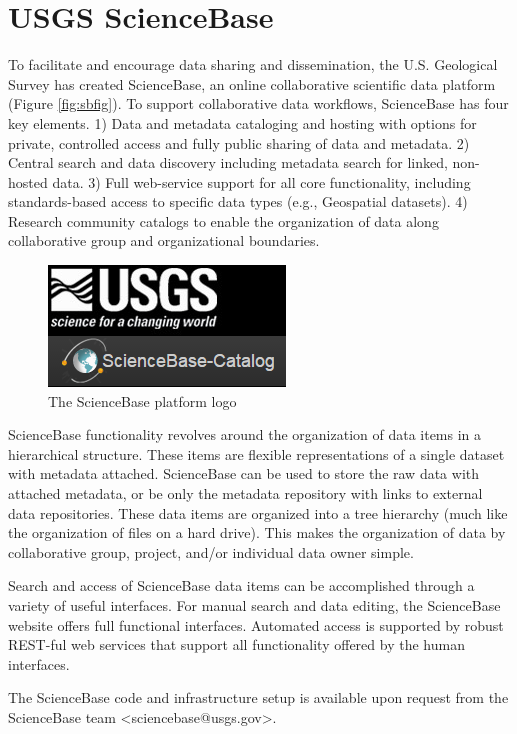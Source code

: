 \section{USGS ScienceBase}

To facilitate and encourage data sharing and dissemination, 
the U.S. Geological Survey has created ScienceBase, an online 
collaborative scientific data platform (Figure \ref{fig:sbfig}). To support collaborative 
data workflows, ScienceBase has four key elements. 1) Data and metadata
cataloging and hosting with options for private, controlled access 
and fully public sharing of data and metadata. 2) Central search and
data discovery including metadata search for linked, non-hosted data. 
3) Full web-service support for all core functionality, including 
standards-based access to specific data types (e.g., Geospatial 
datasets). 4) Research community catalogs to 
enable the organization of data along collaborative group and 
organizational boundaries. 

 \begin{figure}[htbp]
   \centering
   \includegraphics{sblogo}
   \caption{The ScienceBase platform logo}
   \label{figure:sbfig}
 \end{figure}

ScienceBase functionality revolves around the organization of data 
items in a hierarchical structure. These items are flexible representations
of a single dataset with metadata attached. ScienceBase can be used to
store the raw data with attached metadata, or be only the metadata 
repository with links to external data repositories. These data items
are organized into a tree hierarchy (much like the organization of files
on a hard drive). This makes the organization of data by collaborative 
group, project, and/or individual data owner simple. 

Search and access of ScienceBase data items can be accomplished through
a variety of useful interfaces. For manual search and data editing, 
the ScienceBase website offers full functional interfaces. Automated
access is supported by robust REST-ful web services that support all 
functionality offered by the human interfaces. 

The ScienceBase code and infrastructure setup is available upon 
request from the ScienceBase team <sciencebase@usgs.gov>.

